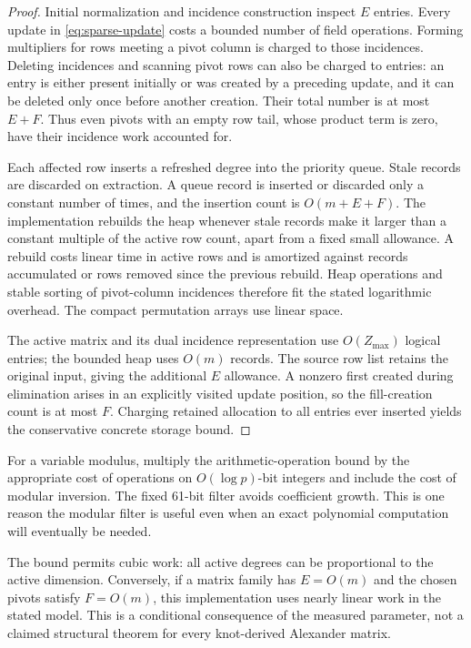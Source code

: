 \begin{proof}
Initial normalization and incidence construction inspect $E$ entries.
Every update in \eqref{eq:sparse-update} costs a bounded number of field
operations.  Forming multipliers for rows meeting a pivot column is charged
to those incidences.  Deleting incidences and scanning pivot rows can also
be charged to entries: an entry is either present initially or was created
by a preceding update, and it can be deleted only once before another
creation.  Their total number is at most $E+F$.  Thus even pivots with an
empty row tail, whose product term is zero, have their incidence work
accounted for.

Each affected row inserts a refreshed degree into the priority queue.
Stale records are discarded on extraction.  A queue record is inserted or
discarded only a constant number of times, and the insertion count is
$O(m+E+F)$.  The implementation rebuilds the heap whenever stale records
make it larger than a constant multiple of the active row count, apart
from a fixed small allowance.  A rebuild costs linear time in active rows
and is amortized against records accumulated or rows removed since the
previous rebuild.  Heap operations and stable sorting of pivot-column
incidences therefore fit the stated logarithmic overhead.  The compact
permutation arrays use linear space.

The active matrix and its dual incidence representation use $O(Z_{\max})$
logical entries; the bounded heap uses $O(m)$ records.  The source row list retains
the original input, giving the additional $E$ allowance.  A nonzero first
created during elimination arises in an explicitly visited update position,
so the fill-creation count is at most $F$.  Charging retained allocation to
all entries ever inserted yields the conservative concrete storage bound.
\end{proof}

For a variable modulus, multiply the arithmetic-operation bound by the
appropriate cost of operations on $O(\log p)$-bit integers and include the
cost of modular inversion.  The fixed 61-bit filter avoids coefficient
growth.  This is one reason the modular filter is useful even when an exact
polynomial computation will eventually be needed.

The bound permits cubic work: all active degrees can be proportional to the
active dimension.  Conversely, if a matrix family has $E=O(m)$ and the chosen
pivots satisfy $F=O(m)$, this implementation uses nearly linear work in the
stated model.  This is a conditional consequence of the measured parameter,
not a claimed structural theorem for every knot-derived Alexander matrix.


